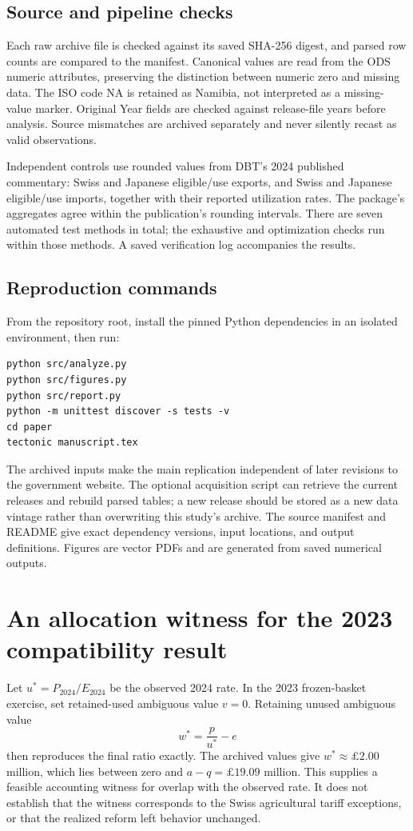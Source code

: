 \documentclass[11pt,a4paper]{article}
\begin{document}
\subsection{Source and pipeline checks}
Each raw archive file is checked against its saved SHA-256 digest, and parsed row counts are compared to the manifest. Canonical values are read from the ODS numeric attributes, preserving the distinction between numeric zero and missing data. The ISO code NA is retained as Namibia, not interpreted as a missing-value marker. Original Year fields are checked against release-file years before analysis. Source mismatches are archived separately and never silently recast as valid observations.

Independent controls use rounded values from DBT's 2024 published commentary: Swiss and Japanese eligible/use exports, and Swiss and Japanese eligible/use imports, together with their reported utilization rates. The package's aggregates agree within the publication's rounding intervals. There are seven automated test methods in total; the exhaustive and optimization checks run within those methods. A saved verification log accompanies the results.

\subsection{Reproduction commands}
From the repository root, install the pinned Python dependencies in an isolated environment, then run:
\begin{verbatim}
python src/analyze.py
python src/figures.py
python src/report.py
python -m unittest discover -s tests -v
cd paper
tectonic manuscript.tex
\end{verbatim}
The archived inputs make the main replication independent of later revisions to the government website. The optional acquisition script can retrieve the current releases and rebuild parsed tables; a new release should be stored as a new data vintage rather than overwriting this study's archive. The source manifest and README give exact dependency versions, input locations, and output definitions. Figures are vector PDFs and are generated from saved numerical outputs.

\section{An allocation witness for the 2023 compatibility result}
Let $u^*=P_{2024}/E_{2024}$ be the observed 2024 rate. In the 2023 frozen-basket exercise, set retained-used ambiguous value $v=0$. Retaining unused ambiguous value
\begin{equation}
 w^*=\frac{p}{u^*}-e
\end{equation}
then reproduces the final ratio exactly. The archived values give $w^*\approx\pounds2.00$ million, which lies between zero and $a-q=\pounds19.09$ million. This supplies a feasible accounting witness for overlap with the observed rate. It does not establish that the witness corresponds to the Swiss agricultural tariff exceptions, or that the realized reform left behavior unchanged.
\end{document}
